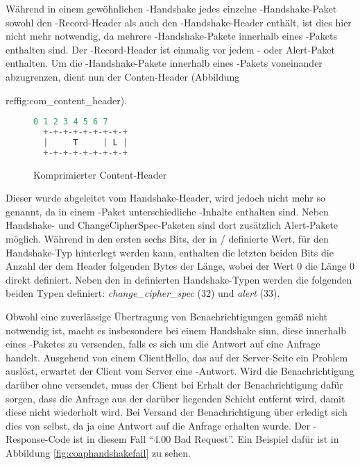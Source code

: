 Während in einem gewöhnlichen -Handshake jedes einzelne -Handshake-Paket sowohl den -Record-Header als auch den
-Handshake-Header enthält, ist dies hier nicht mehr notwendig, da mehrere -Handshake-Pakete innerhalb eines -Pakets
enthalten sind. Der -Record-Header ist einmalig vor jedem - oder Alert-Paket enthalten. Um die -Handshake-Pakete
innerhalb eines -Pakets voneinander abzugrenzen, dient nun der Conten-Header (Abbildung {ref{fig:com\_content\_header}).

\begin{figure}[ht]
  \centering
  \begin{lstlisting}[language=c]
   0 1 2 3 4 5 6 7
  +-+-+-+-+-+-+-+-+
  |     T     | L |
  +-+-+-+-+-+-+-+-+
  \end{lstlisting}
  \caption{Komprimierter Content-Header}
  \label{fig:com_content_header}
\end{figure}

Dieser wurde abgeleitet vom Handshake-Header, wird jedoch nicht mehr so genannt, da in einem -Paket unterschiedliche -Inhalte
enthalten sind. Neben Handshake- und ChangeCipherSpec-Paketen sind dort zusätzlich Alert-Pakete möglich. Während in den ersten sechs Bits, der in
/ definierte Wert, für den Handshake-Typ hinterlegt werden kann, enthalten die letzten beiden Bits die Anzahl der dem Header folgenden
Bytes der Länge, wobei der Wert 0 die Länge 0 direkt definiert. Neben den in  definierten Handshake-Typen werden die folgenden
beiden Typen definiert: \textit{change\_cipher\_spec} (32) und \textit{alert} (33).

Obwohl eine zuverlässige Übertragung von Benachrichtigungen gemäß  nicht notwendig ist, macht es insbesondere bei einem Handshake sinn, diese
innerhalb eines -Paketes zu versenden, falls es sich um die Antwort auf eine Anfrage handelt. Ausgehend von einem ClientHello, das
auf der Server-Seite ein Problem auslöst, erwartet der Client vom Server eine -Antwort. Wird die Benachrichtigung darüber ohne  versendet,
muss der Client bei Erhalt der Benachrichtigung dafür sorgen, dass die Anfrage aus der darüber liegenden  Schicht entfernt wird, damit diese
nicht wiederholt wird. Bei Versand der Benachrichtigung über  erledigt sich dies von selbst, da ja eine Antwort auf die Anfrage erhalten wurde.
Der -Response-Code ist in diesem Fall "`4.00 Bad Request"'. Ein Beispiel dafür ist in Abbildung \ref{fig:coaphandshakefail} zu sehen.

}
